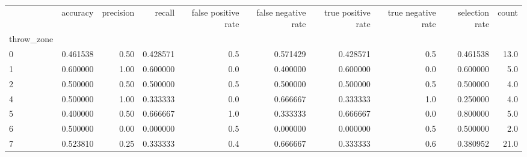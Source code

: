 \begin{tabular}{lrrrrrrrrr}
\toprule
{} &  accuracy &  precision &    recall &  false positive rate &  false negative rate &  true positive rate &  true negative rate &  selection rate &  count \\
throw\_zone &           &            &           &                      &                      &                     &                     &                 &        \\
\midrule
0          &  0.461538 &       0.50 &  0.428571 &                  0.5 &             0.571429 &            0.428571 &                 0.5 &        0.461538 &   13.0 \\
1          &  0.600000 &       1.00 &  0.600000 &                  0.0 &             0.400000 &            0.600000 &                 0.0 &        0.600000 &    5.0 \\
2          &  0.500000 &       0.50 &  0.500000 &                  0.5 &             0.500000 &            0.500000 &                 0.5 &        0.500000 &    4.0 \\
4          &  0.500000 &       1.00 &  0.333333 &                  0.0 &             0.666667 &            0.333333 &                 1.0 &        0.250000 &    4.0 \\
5          &  0.400000 &       0.50 &  0.666667 &                  1.0 &             0.333333 &            0.666667 &                 0.0 &        0.800000 &    5.0 \\
6          &  0.500000 &       0.00 &  0.000000 &                  0.5 &             0.000000 &            0.000000 &                 0.5 &        0.500000 &    2.0 \\
7          &  0.523810 &       0.25 &  0.333333 &                  0.4 &             0.666667 &            0.333333 &                 0.6 &        0.380952 &   21.0 \\
\bottomrule
\end{tabular}
